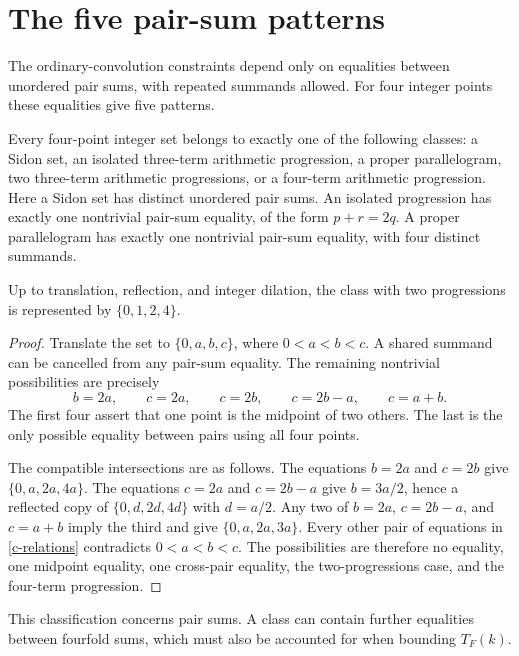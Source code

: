 \section{The five pair-sum patterns}
\label{sec:classification}

The ordinary-convolution constraints depend only on equalities between
unordered pair sums, with repeated summands allowed.  For four integer
points these equalities give five patterns.

\begin{proposition}\label{c-classification}
Every four-point integer set belongs to exactly one of the following
classes: a Sidon set, an isolated three-term arithmetic progression, a
proper parallelogram, two three-term arithmetic progressions, or a
four-term arithmetic progression.  Here a Sidon set has distinct unordered
pair sums.  An isolated progression has exactly one nontrivial pair-sum
equality, of the form $p+r=2q$.  A proper parallelogram has exactly one
nontrivial pair-sum equality, with four distinct summands.

Up to translation, reflection, and integer dilation, the class with two
progressions is represented by $\{0,1,2,4\}$.
\end{proposition}

\begin{proof}
Translate the set to $\{0,a,b,c\}$, where $0<a<b<c$.  A shared summand
can be cancelled from any pair-sum equality.  The remaining nontrivial
possibilities are precisely
\begin{equation}\label{c-relations}
 b=2a,\qquad c=2a,\qquad c=2b,\qquad
 c=2b-a,\qquad c=a+b.
\end{equation}
The first four assert that one point is the midpoint of two others.
The last is the only possible equality between pairs using all four points.

The compatible intersections are as follows.  The equations $b=2a$ and
$c=2b$ give $\{0,a,2a,4a\}$.  The equations $c=2a$ and $c=2b-a$ give
$b=3a/2$, hence a reflected copy of $\{0,d,2d,4d\}$ with $d=a/2$.
Any two of $b=2a$, $c=2b-a$, and $c=a+b$ imply the third and give
$\{0,a,2a,3a\}$.  Every other pair of equations in
\eqref{c-relations} contradicts $0<a<b<c$.  The possibilities are
therefore no equality, one midpoint equality, one cross-pair equality,
the two-progressions case, and the four-term progression.
\end{proof}

This classification concerns pair sums.  A class can contain further
equalities between fourfold sums, which must also be accounted for when
bounding $T_F(k)$.

